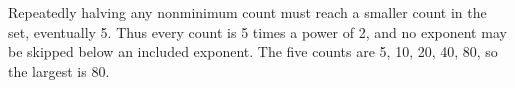 Repeatedly halving any nonminimum count must reach a smaller count in the set, eventually 5. Thus every count is 5 times a power of 2, and no exponent may be skipped below an included exponent. The five counts are 5, 10, 20, 40, 80, so the largest is $\boxed{80}$.

